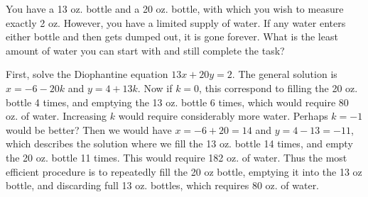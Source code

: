 \begin{questions}
  
  	\begin{answer}
  	\end{answer}
  	
  	
  	


\question You have a 13 oz. bottle and a 20 oz. bottle, with which you wish to measure exactly 2 oz.  However, you have a limited supply of water.  If any water enters either bottle and then gets dumped out, it is gone forever.  What is the least amount of water you can start with and still complete the task?

	\begin{answer}
		First, solve the Diophantine equation $13x + 20 y = 2$.  The general solution is $x = -6 - 20k$ and $y = 4+13k$.  Now if $k = 0$, this correspond to filling the 20 oz. bottle 4 times, and emptying the 13 oz. bottle 6 times, which would require 80 oz. of water.  Increasing $k$ would require considerably more water.  Perhaps $k = -1$ would be better?  Then we would have $x = -6+20 = 14$ and $y = 4-13 = -11$, which describes the solution where we fill the 13 oz. bottle 14 times, and empty the 20 oz. bottle 11 times.  This would require 182 oz. of water.  Thus the most efficient procedure is to repeatedly fill the 20 oz bottle, emptying it into the 13 oz bottle, and discarding full 13 oz. bottles, which requires 80 oz. of water.
	\end{answer}
	
	
	

 
\end{questions}



